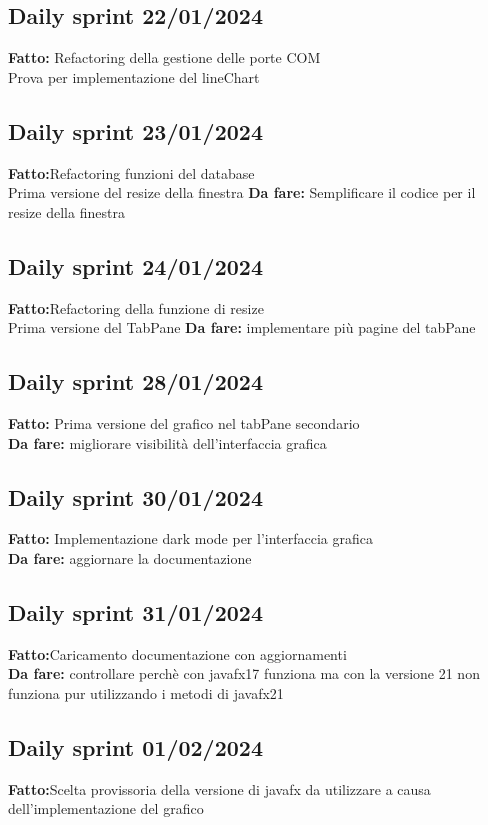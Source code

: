 \documentclass{report}
\begin{document}
\subsection*{Daily sprint 22/01/2024}
\textbf{Fatto:} Refactoring della gestione delle porte COM\\
Prova per implementazione del lineChart

\subsection*{Daily sprint 23/01/2024}
\textbf{Fatto:}Refactoring funzioni del database\\
Prima versione del resize della finestra
\textbf{Da fare:} Semplificare il codice per il resize della finestra
\subsection*{Daily sprint 24/01/2024}
\textbf{Fatto:}Refactoring della funzione di resize\\
Prima versione del TabPane
\textbf{Da fare:} implementare più pagine del tabPane
\subsection*{Daily sprint 28/01/2024}
\textbf{Fatto:} Prima versione del grafico nel tabPane secondario\\
\textbf{Da fare:} migliorare visibilità dell'interfaccia grafica
\subsection*{Daily sprint 30/01/2024}
\textbf{Fatto:}  Implementazione dark mode per l'interfaccia grafica\\
\textbf{Da fare:} aggiornare la documentazione
\subsection*{Daily sprint 31/01/2024}
\textbf{Fatto:}Caricamento documentazione con aggiornamenti\\
\textbf{Da fare:} controllare perchè con javafx17 funziona ma con la versione 21 non funziona pur utilizzando i metodi di javafx21
\subsection*{Daily sprint 01/02/2024}
\textbf{Fatto:}Scelta provissoria della versione di javafx da utilizzare a causa dell'implementazione del grafico
\end{document}
